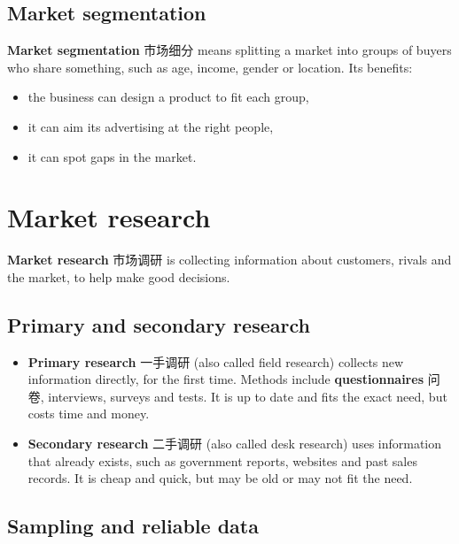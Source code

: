 \documentclass[11pt]{article}
\begin{document}
\subsection*{Market segmentation}

\textbf{Market segmentation} 市场细分 means splitting a market into groups of buyers who share something, such as age, income, gender or location. Its benefits:

\begin{itemize}
\item the business can design a product to fit each group,

\item it can aim its advertising at the right people,

\item it can spot gaps in the market.

\end{itemize}

\section*{Market research}

\textbf{Market research} 市场调研 is collecting information about customers, rivals and the market, to help make good decisions.

\subsection*{Primary and secondary research}

\begin{itemize}
\item \textbf{Primary research} 一手调研 (also called field research) collects new information directly, for the first time. Methods include \textbf{questionnaires} 问卷, interviews, surveys and tests. It is up to date and fits the exact need, but costs time and money.

\item \textbf{Secondary research} 二手调研 (also called desk research) uses information that already exists, such as government reports, websites and past sales records. It is cheap and quick, but may be old or may not fit the need.

\end{itemize}

\subsection*{Sampling and reliable data}
\end{document}
